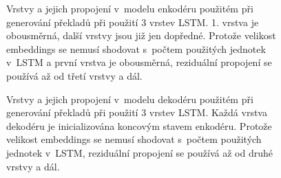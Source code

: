 \begin{figure}[H]
    \begin{center}
    \end{center}
	\caption{Vrstvy a jejich propojení v~modelu enkodéru použitém při generování překladů při použití 3 vrstev LSTM. 1. vrstva je obousměrná, další vrstvy jsou již jen dopředné. Protože velikost embeddings se nemusí shodovat s~počtem použitých jednotek v~LSTM a první vrstva je obousměrná, reziduální propojení se používá až od třetí vrstvy a dál.}
	\label{img:encodermodel}
\end{figure}

\begin{figure}[H]
    \begin{center}
    \end{center}
	\caption{Vrstvy a jejich propojení v~modelu dekodéru použitém při generování překladů při použití 3 vrstev LSTM. Každá vrstva dekodéru je inicializována koncovým stavem enkodéru. Protože velikost embeddings se nemusí shodovat s~počtem použitých jednotek v~LSTM, reziduální propojení se používá až od druhé vrstvy a dál.}
	\label{img:decodermodel}
\end{figure}



